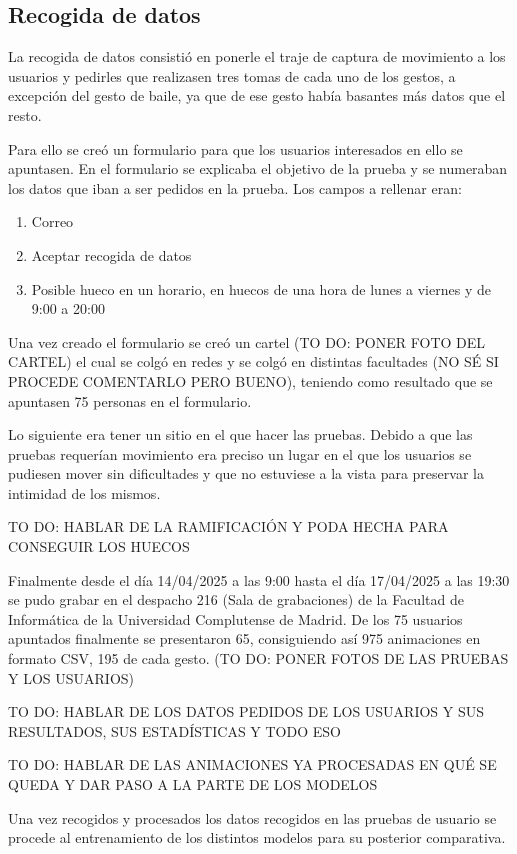 \subsection{Recogida de datos}
La recogida de datos consistió en ponerle el traje de captura de movimiento a los usuarios y pedirles que realizasen tres tomas de cada uno de los gestos, a excepción del gesto de baile, ya que de ese gesto había basantes más datos que el resto.

Para ello se creó un formulario para que los usuarios interesados en ello se apuntasen. En el formulario se explicaba el objetivo de la prueba y se numeraban los datos que iban a ser pedidos en la prueba. Los campos a rellenar eran: 

\begin{enumerate}
	\item Correo
	\item Aceptar recogida de datos
	\item Posible hueco en un horario, en huecos de una hora de lunes a viernes y de 9:00 a 20:00
\end{enumerate}

Una vez creado el formulario se creó un cartel (TO DO: PONER FOTO DEL CARTEL) el cual se colgó en redes y se colgó en distintas facultades (NO SÉ SI PROCEDE COMENTARLO PERO BUENO), teniendo como resultado que se apuntasen 75 personas en el formulario.

Lo siguiente era tener un sitio en el que hacer las pruebas. Debido a que las pruebas requerían movimiento era preciso un lugar en el que los usuarios se pudiesen mover sin dificultades y que no estuviese a la vista para preservar la intimidad de los mismos.

TO DO: HABLAR DE LA RAMIFICACIÓN Y PODA HECHA PARA CONSEGUIR LOS HUECOS

Finalmente desde el día 14/04/2025 a las 9:00 hasta el día 17/04/2025 a las 19:30 se pudo grabar en el despacho 216 (Sala de grabaciones) de la Facultad de Informática de la Universidad Complutense de Madrid.
De los 75 usuarios apuntados finalmente se presentaron 65, consiguiendo así 975 animaciones en formato CSV, 195 de cada gesto. (TO DO: PONER FOTOS DE LAS PRUEBAS Y LOS USUARIOS)

TO DO: HABLAR DE LOS DATOS PEDIDOS DE LOS USUARIOS Y SUS RESULTADOS, SUS ESTADÍSTICAS Y TODO ESO

TO DO: HABLAR DE LAS ANIMACIONES YA PROCESADAS EN QUÉ SE QUEDA Y DAR PASO A LA PARTE DE LOS MODELOS

Una vez recogidos y procesados los datos recogidos en las pruebas de usuario se procede al entrenamiento de los distintos modelos para su posterior comparativa.
